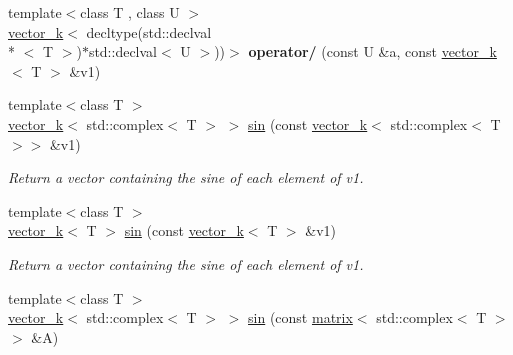 \begin{DoxyCompactItemize}
\item 
\hypertarget{namespacekeycpp_aa5daf45d6627feee18402005fcd83cfd}{{\footnotesize template$<$class T , class U $>$ }\\\hyperlink{classkeycpp_1_1vector__k}{vector\-\_\-k}$<$ decltype(std\-::declval\\*
$<$ T $>$)$\ast$std\-::declval$<$ U $>$))$>$ {\bfseries operator/} (const U \&a, const \hyperlink{classkeycpp_1_1vector__k}{vector\-\_\-k}$<$ T $>$ \&v1)}\label{namespacekeycpp_aa5daf45d6627feee18402005fcd83cfd}

\item 
\hypertarget{namespacekeycpp_a3fad354ed572051e939cc71209c112ab}{{\footnotesize template$<$class T $>$ }\\\hyperlink{classkeycpp_1_1vector__k}{vector\-\_\-k}$<$ std\-::complex$<$ T $>$ $>$ \hyperlink{namespacekeycpp_a3fad354ed572051e939cc71209c112ab}{sin} (const \hyperlink{classkeycpp_1_1vector__k}{vector\-\_\-k}$<$ std\-::complex$<$ T $>$$>$ \&v1)}\label{namespacekeycpp_a3fad354ed572051e939cc71209c112ab}

\begin{DoxyCompactList}\small\item\em Return a vector containing the sine of each element of v1. \end{DoxyCompactList}\item 
\hypertarget{namespacekeycpp_aea600162295a122a2371d75f80f764c5}{{\footnotesize template$<$class T $>$ }\\\hyperlink{classkeycpp_1_1vector__k}{vector\-\_\-k}$<$ T $>$ \hyperlink{namespacekeycpp_aea600162295a122a2371d75f80f764c5}{sin} (const \hyperlink{classkeycpp_1_1vector__k}{vector\-\_\-k}$<$ T $>$ \&v1)}\label{namespacekeycpp_aea600162295a122a2371d75f80f764c5}

\begin{DoxyCompactList}\small\item\em Return a vector containing the sine of each element of v1. \end{DoxyCompactList}\item 
\hypertarget{namespacekeycpp_a62fe1fbcb9ed4e33c5b31dc2c77bdbc4}{{\footnotesize template$<$class T $>$ }\\\hyperlink{classkeycpp_1_1vector__k}{vector\-\_\-k}$<$ std\-::complex$<$ T $>$ $>$ \hyperlink{namespacekeycpp_a62fe1fbcb9ed4e33c5b31dc2c77bdbc4}{sin} (const \hyperlink{classkeycpp_1_1matrix}{matrix}$<$ std\-::complex$<$ T $>$$>$ \&A)}\label{namespacekeycpp_a62fe1fbcb9ed4e33c5b31dc2c77bdbc4}


\end{DoxyCompactItemize}
